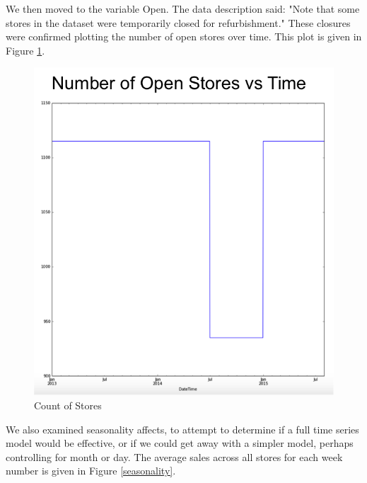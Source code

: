 \documentclass[DIV=calc, paper=a4, fontsize=11pt]{scrartcl}	 %
\begin{document}
We then moved to the variable Open. The data description said: "Note that some stores in the dataset were temporarily closed for refurbishment."\cite{RossmannKaggle} These closures were confirmed plotting the number of open stores over time. This plot is given in Figure \ref{closedstores}. 
 

\begin{figure}[!htbp]
\centering
\caption{Count of Stores}
\label{closedstores}
\includegraphics[scale=0.70]{figures/closedstores.png}
\end{figure} 

We also examined seasonality affects, to attempt to determine if a full time series model would be effective, or if we could get away with a simpler model, perhaps controlling for month or day. The average sales across all stores for each week number is given in Figure \ref{seasonality}.
\end{document}
